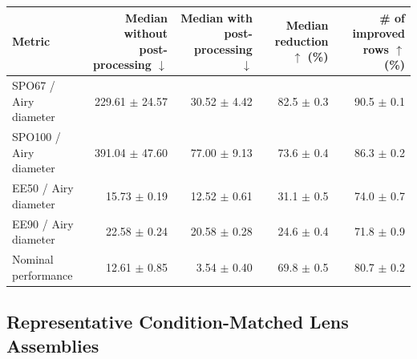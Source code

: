 \begin{center}
\begin{minipage}{0.98\linewidth}
\centering
\scriptsize
\setlength{\tabcolsep}{4pt}
\label{tab:raytrace_postproc_quality_full}
\begin{tabular}{lrrrr}
\toprule
\textbf{Metric} & \shortstack{\textbf{Median without}\\\textbf{post-processing $\downarrow$}} & \shortstack{\textbf{Median with}\\\textbf{post-processing $\downarrow$}} & \textbf{Median reduction $\uparrow$ (\%)} & \shortstack{\textbf{\# of improved}\\\textbf{rows $\uparrow$ (\%)}} \\
\midrule
SPO67 / Airy diameter & 229.61 \ensuremath{\pm} 24.57 & 30.52 \ensuremath{\pm} 4.42 & 82.5 \ensuremath{\pm} 0.3 & 90.5 \ensuremath{\pm} 0.1 \\
SPO100 / Airy diameter & 391.04 \ensuremath{\pm} 47.60 & 77.00 \ensuremath{\pm} 9.13 & 73.6 \ensuremath{\pm} 0.4 & 86.3 \ensuremath{\pm} 0.2 \\
EE50 / Airy diameter & 15.73 \ensuremath{\pm} 0.19 & 12.52 \ensuremath{\pm} 0.61 & 31.1 \ensuremath{\pm} 0.5 & 74.0 \ensuremath{\pm} 0.7 \\
EE90 / Airy diameter & 22.58 \ensuremath{\pm} 0.24 & 20.58 \ensuremath{\pm} 0.28 & 24.6 \ensuremath{\pm} 0.4 & 71.8 \ensuremath{\pm} 0.9 \\
Nominal performance & 12.61 \ensuremath{\pm} 0.85 & 3.54 \ensuremath{\pm} 0.40 & 69.8 \ensuremath{\pm} 0.5 & 80.7 \ensuremath{\pm} 0.2 \\
\bottomrule
\end{tabular}
\end{minipage}
\end{center}

\subsection{Representative Condition-Matched Lens Assemblies}
\label{sec:results_representative_designs}


